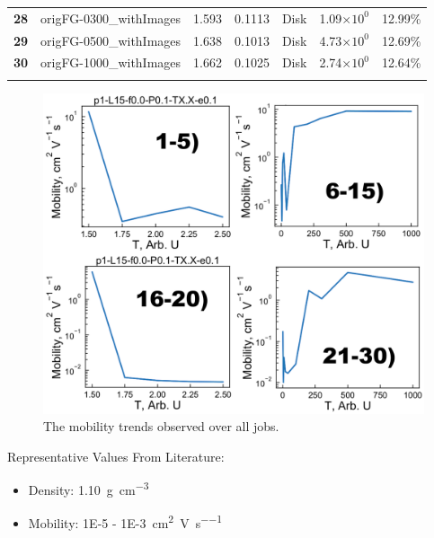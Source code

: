\documentclass[12pt]{article}
\def\mobunits{\square\centi\meter\per\volt\per\second}
\def\gcm{\gram\per\cubic\centi\meter}
\def\ccg{\cellcolor{gray}}
\begin{document}
\begin{center}
\begin{adjustbox}{max width=\textwidth}
\begin{tabular}{| c | c | c | c | c | c | c |}
\textbf{28}&\rule{0pt}{2.5ex}origFG-0300\_withImages&1.593&0.1113&Disk&1.09$\times 10^{0}$&12.99\%\\
{\ccg}\textbf{29}&{\ccg}\rule{0pt}{2.5ex}origFG-0500\_withImages&{\ccg} 1.638&{\ccg}0.1013&{\ccg}Disk&{\ccg}4.73$\times 10^{0}$&{\ccg}12.69\%\\
\textbf{30}&\rule{0pt}{2.5ex}origFG-1000\_withImages&1.662&0.1025&Disk&2.74$\times 10^{0}$&12.64\%\\
\hhline{-------}
\end{tabular}\label{table:mob}
\end{adjustbox}
\end{center}

\begin{figure}[h!]\centering
	\includegraphics[width=\textwidth]{Figures/mobilityHole.pdf}
    \caption{The mobility trends observed over all jobs.}
	\label{fig:Mob}
\end{figure}

Representative Values From Literature:
\begin{itemize}
    \item{Density: \SI{1.10}{\gcm}\cite{Newbloom2012a}}
\item{Mobility: \SI{1E-5}{} - \SI{1E-3}{\mobunits}\cite{Ballantyne2008b,Mauer2010,Pandey2000,Kim2006}}
\end{itemize}

\clearpage
\end{document}
